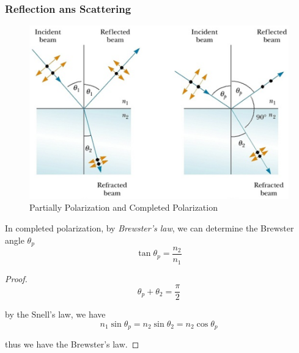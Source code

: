 \documentclass[UTF8]{book}
\begin{document}
\subsubsection{Reflection ans Scattering}
\begin{figure}[H]
\centering
\label{fig:15}
\includegraphics[scale=0.5]{Figure/15.PNG}
\caption{Partially Polarization and Completed Polarization}
\end{figure}
In completed polarization, by \emph{Brewster's law}, we can determine the Brewster angle $\theta _p$
\[\tan \theta _p=\frac{n_2}{n_1}\]

\begin{proof}
\[\theta _p+\theta _2=\frac{\pi }{2}\]

by the Snell's law, we have
\[n_1\sin \theta _p=n_2\sin \theta _2=n_2\cos \theta _p\]

thus we have the Brewster's law.
\end{proof}
\end{document}
